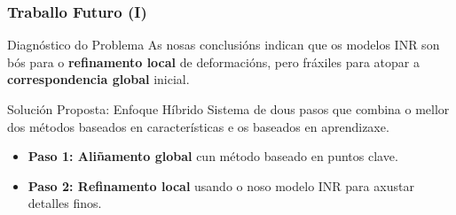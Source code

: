 \documentclass[xcolor=dvipsnames]{beamer}
\begin{document}
\begin{frame}
    \frametitle{Traballo Futuro (I)}
    
    \begin{block}{Diagnóstico do Problema}
        As nosas conclusións indican que os modelos INR son bós para o \textbf{refinamento local} de deformacións, pero fráxiles para atopar a \textbf{correspondencia global} inicial.
    \end{block}
    
    \begin{alertblock}{Solución Proposta: Enfoque Híbrido}
        Sistema de dous pasos que combina o mellor dos métodos baseados en características e os baseados en aprendizaxe.
    \end{alertblock}
    
    \begin{itemize}
        \item \textbf{Paso 1: Aliñamento global} cun método baseado en puntos clave.
        \item \textbf{Paso 2: Refinamento local} usando o noso modelo INR para axustar detalles finos.
    \end{itemize}
    
\end{frame}
\end{document}
